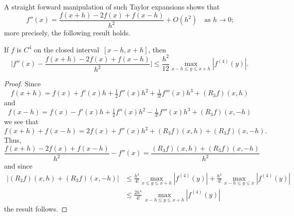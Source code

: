 A straight forward manipulation of such Taylor expansions shows that
\[
f''(x)=\frac{f(x+h)-2f(x)+f(x-h)}{h^2}+O(h^2)\quad\text{as $h\to0$;}
\]
more precisely, the following result holds.

\begin{theorem}\label{thm: 2nd central diff}
If $f$ is $C^4$ on the closed interval~$[x-h,x+h]$, then
\[
\biggl|f''(x)-\frac{f(x+h)-2f(x)+f(x-h)}{h^2}\biggr|\le\frac{h^2}{12}
	\max_{x-h\le y\le x+h}|f^{(4)}(y)|.
\]
\end{theorem}
\begin{proof}
Since
\[
f(x+h)=f(x)+f'(x)h+\tfrac12f''(x)h^2+\tfrac{1}{3!}f'''(x)h^3+(R_3f)(x,h)
\]
and
\[
f(x-h)=f(x)-f'(x)h+\tfrac12f''(x)h^2-\tfrac{1}{3!}f'''(x)h^3+(R_3f)(x,-h)
\]
we see that
\[
f(x+h)+f(x-h)=2f(x)+f''(x)h^2+(R_3f)(x,h)+(R_3f)(x,-h).
\]
Thus,
\begin{equation}\label{eq: second diff remainder}
\frac{f(x+h)-2f(x)+f(x-h)}{h^2}-f''(x)=\frac{(R_3f)(x,h)+(R_3f)(x,-h)}{h^2}
\end{equation}
and since
\begin{align*}
|(R_3f)(x,h)+(R_3f)(x,-h)|&\le
\frac{h^4}{4!}\max_{x\le y\le x+h}|f^{(4)}(y)|
+\frac{h^4}{4!}\max_{x-h\le y\le x}|f^{(4)}(y)|\\
	&\le\frac{2h^4}{4!}\,\max_{x-h\le y\le x+h}|f^{(4)}(y)|
\end{align*}
the result follows.
\end{proof}


